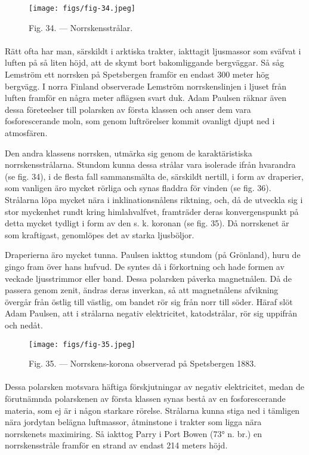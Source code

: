 \documentclass[a4paper, 12pt, oneside, swedish]{article}
\begin{document}
\begin{figure}[H]
\centering
\texttt{[image: figs/fig-34.jpeg]}
\caption{Fig. 34. --- Norrskensstrålar.}
\end{figure}
\paragraph{}
Rätt ofta har man, särskildt i arktiska trakter, iakttagit ljusmassor som sväfvat i luften på så liten höjd, att de skymt bort bakomliggande bergväggar. Så såg Lemström ett norrsken på Spetsbergen framför en endast 300 meter hög bergvägg. I norra Finland observerade Lemström norrskenslinjen i ljuset från luften framför en några meter aflägsen svart duk. Adam Paulsen räknar även dessa företeelser till polarsken av första klassen och anser dem vara fosforescerande moln, som genom luftrörelser kommit ovanligt djupt ned i atmosfären.

Den andra klassens norrsken, utmärka sig genom de karaktäristiska norrskensstrålarna. Stundom kunna dessa strålar vara isolerade ifrån hvarandra (se fig. 34), i de flesta fall sammansmälta de, särskildt nertill, i form av draperier, som vanligen äro mycket rörliga och synas fladdra för vinden (se fig. 36). Strålarna löpa mycket nära i inklinationsnålens riktning, och, då de utveckla sig i stor myckenhet rundt kring himlahvalfvet, framträder deras konvergenspunkt på detta mycket tydligt i form av den s. k. koronan (se fig. 35). Då norrskenet är som kraftigast, genomlöpes det av starka ljusböljor.

Draperierna äro mycket tunna. Paulsen iakttog stundom (på Grönland), huru de gingo fram över hans hufvud. De syntes då i förkortning och hade formen av veckade ljusstrimmor eller band. Dessa polarsken påverka magnetnålen. Då de passera genom zenit, ändras deras inverkan, så att magnetnålens afvikning övergår från östlig till västlig, om bandet rör sig från norr till söder. Häraf slöt Adam Paulsen, att i strålarna negativ elektricitet, katodstrålar, rör sig uppifrån och nedåt.

\begin{figure}[H]
\centering
\texttt{[image: figs/fig-35.jpeg]}
\caption{Fig. 35. --- Norrskens-korona observerad på Spetsbergen 1883.}
\end{figure}
\paragraph{}
Dessa polarsken motsvara häftiga förskjutningar av negativ elektricitet, medan de förutnämnda polarskenen av första klassen synas bestå av en fosforescerande materia, som ej är i någon starkare rörelse. Strålarna kunna stiga ned i tämligen nära jordytan belägna luftmassor, åtminstone i trakter som ligga nära norrskenets maximiring. Så iakttog Parry i Port Bowen (73° n. br.) en norrskensstråle framför en strand av endast 214 meters höjd.
\end{document}
